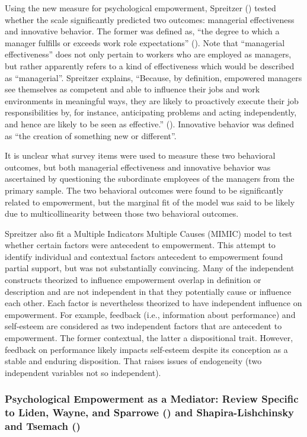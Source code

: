 \documentclass[
  11pt,
  a4paper,
]{article}
\begin{document}
Using the new measure for psychological empowerment, Spreitzer
() tested whether the scale
significantly predicted two outcomes: managerial effectiveness and
innovative behavior. The former was defined as, ``the degree to which a
manager fulfills or exceeds work role expectations''
(). Note that ``managerial
effectiveness'' does not only pertain to workers who are employed as
managers, but rather apparently refers to a kind of effectiveness which
would be described as ``managerial''. Spreitzer explains, ``Because, by
definition, empowered managers see themselves as competent and able to
influence their jobs and work environments in meaningful ways, they are
likely to proactively execute their job responsibilities by, for
instance, anticipating problems and acting independently, and hence are
likely to be seen as effective.'' (). Innovative behavior was defined as ``the creation of something
new or different''.

It is unclear what survey items were used to measure these two
behavioral outcomes, but both managerial effectiveness and innovative
behavior was ascertained by questioning the subordinate employees of the
managers from the primary sample. The two behavioral outcomes were found
to be significantly related to empowerment, but the marginal fit of the
model was said to be likely due to multicollinearity between those two
behavioral outcomes.

Spreitzer also fit a Multiple Indicators Multiple Causes (MIMIC) model
to test whether certain factors were antecedent to empowerment. This
attempt to identify individual and contextual factors antecedent to
empowerment found partial support, but was not substantially convincing.
Many of the independent constructs theorized to influence empowerment
overlap in definition or description and are not independent in that
they potentially cause or influence each other. Each factor is
nevertheless theorized to have independent influence on empowerment. For
example, feedback (i.e., information about performance) and self-esteem
are considered as two independent factors that are antecedent to
empowerment. The former contextual, the latter a dispositional trait.
However, feedback on performance likely impacts self-esteem despite its
conception as a stable and enduring disposition. That raises issues of
endogeneity (two independent variables not so independent).

\subsubsection{\texorpdfstring{Psychological Empowerment as a Mediator:
Review Specific to Liden, Wayne, and Sparrowe
() and Shapira-Lishchinsky and Tsemach
()}{Psychological Empowerment as a Mediator: Review Specific to Liden, Wayne, and Sparrowe (2000) and Shapira-Lishchinsky and Tsemach (2014)}}\label{psychological-empowerment-as-a-mediator-review-specific-to-liden2000-and-shapira-lishchinsky2014}
\end{document}
